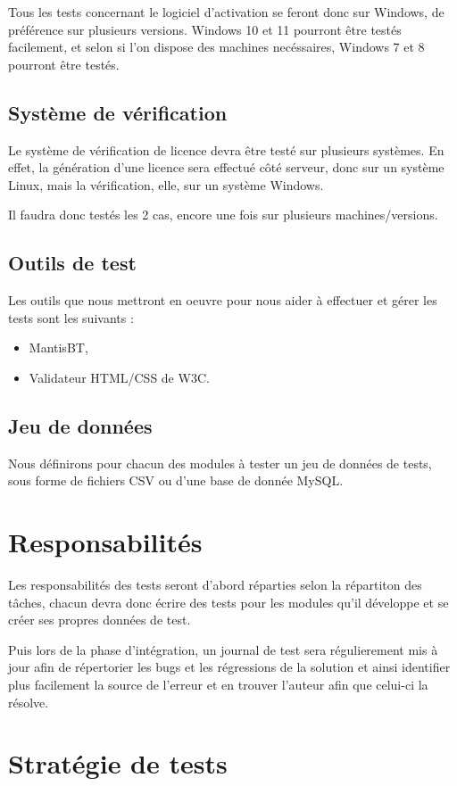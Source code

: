 Tous les tests concernant le logiciel d'activation se
feront donc sur Windows, de préférence sur plusieurs versions. Windows 10 et 11 pourront être
testés facilement, et selon si l'on dispose des machines necéssaires, Windows 7 et 8 pourront être
testés.

\section{Système de vérification}
Le système de vérification de licence devra être testé sur plusieurs systèmes. En effet, la
génération d'une licence sera effectué côté serveur, donc sur un système Linux, mais la
vérification, elle, sur un système Windows.

Il faudra donc testés les 2 cas, encore une fois sur plusieurs machines/versions.

\section{Outils de test}
Les outils que nous mettront en oeuvre pour nous aider à effectuer et gérer les tests sont les
suivants :
\begin{itemize}
    \item MantisBT,
    \item Validateur HTML/CSS de W3C.
\end{itemize}

\section{Jeu de données}
Nous définirons pour chacun des modules à tester un jeu de données de tests, sous forme de fichiers
CSV ou d'une base de donnée MySQL.
 
\chapter{Responsabilités}
Les responsabilités des tests seront d'abord réparties selon la répartiton des tâches, chacun
devra donc écrire des tests pour les modules qu'il développe et se créer ses propres données
de test.

Puis lors de la phase d'intégration, un journal de test sera régulierement mis à jour
afin de répertorier les bugs et les régressions de la solution et ainsi identifier plus      
facilement la source de l'erreur et en trouver l'auteur afin que celui-ci la résolve.


\chapter{Stratégie de tests}

